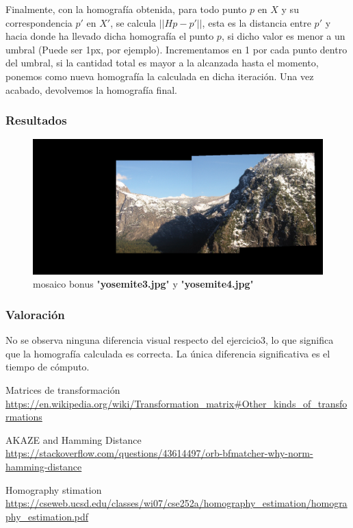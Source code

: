 \documentclass{article}
\begin{document}
\newline\newline
Finalmente, con la homografía obtenida, para todo punto $p$ en $X$ y su correspondencia $p'$ en $X'$, se calcula $\vert\vert Hp-p'\vert\vert$, esta es la distancia entre $p'$ y hacia donde ha llevado dicha homografía el punto $p$, si dicho valor es menor a un umbral (Puede ser 1px, por ejemplo). Incrementamos en 1 por cada punto dentro del umbral, si la cantidad total es mayor a la alcanzada hasta el momento, ponemos como nueva homografía la calculada en dicha iteración. Una vez acabado, devolvemos la homografía final.

\subsubsection{Resultados}

\begin{figure}[hbt!]
	\centering
	\includegraphics[width=1.0\textwidth]{../assets/Bonus-RANSAC.png}
	\caption{mosaico bonus "\textbf{yosemite3.jpg}" y "\textbf{yosemite4.jpg}"}
\end{figure}

\subsubsection{Valoración}

No se observa ninguna diferencia visual respecto del ejercicio3, lo que significa que la homografía calculada es correcta. La única diferencia significativa es el tiempo de cómputo.

\newpage

\begin{thebibliography}{9}
	
	Matrices de transformación \\
	\url{https://en.wikipedia.org/wiki/Transformation_matrix#Other_kinds_of_transformations}
	
	
	AKAZE and Hamming Distance \\
	\url{
		https://stackoverflow.com/questions/43614497/orb-bfmatcher-why-norm-hamming-distance}
	
	Homography stimation \\
	\url{https://cseweb.ucsd.edu/classes/wi07/cse252a/homography_estimation/homography_estimation.pdf}
		
		
		
\end{thebibliography}
\end{document}
